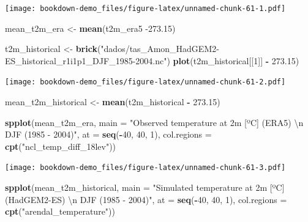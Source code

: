 \documentclass[]{book}
\newenvironment{Shaded}{\begin{snugshade}}{\end{snugshade}}
\newcommand{\CharTok}[1]{\textcolor[rgb]{0.31,0.60,0.02}{#1}}
\newcommand{\DataTypeTok}[1]{\textcolor[rgb]{0.13,0.29,0.53}{#1}}
\newcommand{\DecValTok}[1]{\textcolor[rgb]{0.00,0.00,0.81}{#1}}
\newcommand{\FloatTok}[1]{\textcolor[rgb]{0.00,0.00,0.81}{#1}}
\newcommand{\KeywordTok}[1]{\textcolor[rgb]{0.13,0.29,0.53}{\textbf{#1}}}
\newcommand{\NormalTok}[1]{#1}
\newcommand{\OperatorTok}[1]{\textcolor[rgb]{0.81,0.36,0.00}{\textbf{#1}}}
\newcommand{\StringTok}[1]{\textcolor[rgb]{0.31,0.60,0.02}{#1}}
\begin{document}
\texttt{[image: bookdown-demo\_files/figure-latex/unnamed-chunk-61-1.pdf]}

\begin{Shaded}
\begin{Highlighting}[]
\NormalTok{mean_t2m_era <-}\StringTok{ }\KeywordTok{mean}\NormalTok{(t2m_era5 }\FloatTok{-273.15}\NormalTok{)}

\NormalTok{t2m_historical <-}\StringTok{ }\KeywordTok{brick}\NormalTok{(}\StringTok{"dados/tas_Amon_HadGEM2-ES_historical_r1i1p1_DJF_1985-2004.nc"}\NormalTok{)}
\KeywordTok{plot}\NormalTok{(t2m_historical[[}\DecValTok{1}\NormalTok{]] }\OperatorTok{-}\StringTok{ }\FloatTok{273.15}\NormalTok{)}
\end{Highlighting}
\end{Shaded}

\texttt{[image: bookdown-demo\_files/figure-latex/unnamed-chunk-61-2.pdf]}

\begin{Shaded}
\begin{Highlighting}[]
\NormalTok{mean_t2m_historical <-}\StringTok{ }\KeywordTok{mean}\NormalTok{(t2m_historical }\OperatorTok{-}\StringTok{ }\FloatTok{273.15}\NormalTok{)}

\KeywordTok{spplot}\NormalTok{(mean_t2m_era,}
            \DataTypeTok{main =} \StringTok{"Observed temperature at 2m [ºC] (ERA5) }\CharTok{\textbackslash{}n}\StringTok{ DJF (1985 - 2004)"}\NormalTok{,}
            \DataTypeTok{at =} \KeywordTok{seq}\NormalTok{(}\OperatorTok{-}\DecValTok{40}\NormalTok{, }\DecValTok{40}\NormalTok{, }\DecValTok{1}\NormalTok{),}
            \DataTypeTok{col.regions =} \KeywordTok{cpt}\NormalTok{(}\StringTok{"ncl_temp_diff_18lev"}\NormalTok{))}
\end{Highlighting}
\end{Shaded}

\texttt{[image: bookdown-demo\_files/figure-latex/unnamed-chunk-61-3.pdf]}

\begin{Shaded}
\begin{Highlighting}[]
\KeywordTok{spplot}\NormalTok{(mean_t2m_historical,}
            \DataTypeTok{main =} \StringTok{"Simulated temperature at 2m [ºC] (HadGEM2-ES) }\CharTok{\textbackslash{}n}\StringTok{ DJF (1985 - 2004)"}\NormalTok{,}
            \DataTypeTok{at =} \KeywordTok{seq}\NormalTok{(}\OperatorTok{-}\DecValTok{40}\NormalTok{, }\DecValTok{40}\NormalTok{, }\DecValTok{1}\NormalTok{),}
            \DataTypeTok{col.regions =} \KeywordTok{cpt}\NormalTok{(}\StringTok{"arendal_temperature"}\NormalTok{))}
\end{Highlighting}
\end{Shaded}
\end{document}
